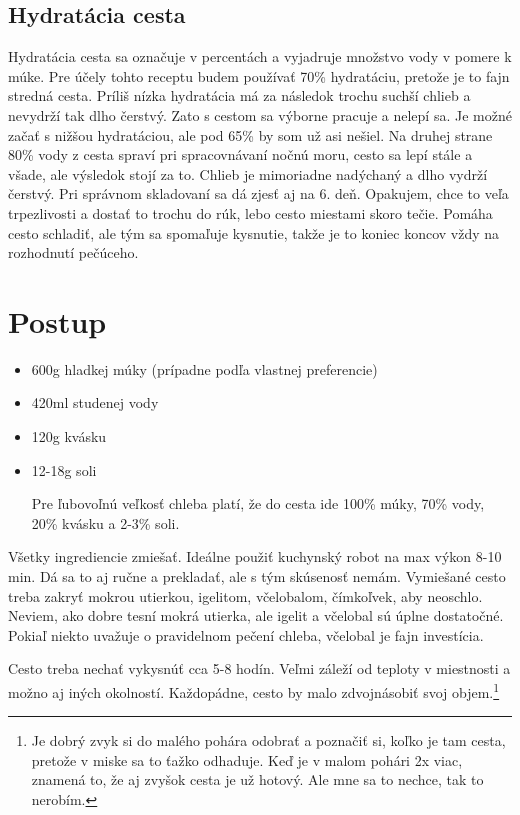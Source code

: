 \documentclass[a4paper,12pt]{article}
\begin{document}
\subsection{Hydratácia cesta}
Hydratácia cesta sa označuje v percentách a vyjadruje množstvo vody v pomere k múke. Pre účely tohto receptu budem používať 70\% hydratáciu, pretože je to fajn stredná cesta. Príliš nízka hydratácia má za následok trochu suchší chlieb a nevydrží tak dlho čerstvý. Zato s cestom sa výborne pracuje a nelepí sa. Je možné začať s nižšou hydratáciou, ale pod 65\% by som už asi nešiel. Na druhej strane 80\% vody z cesta spraví pri spracovnávaní nočnú moru, cesto sa lepí stále a všade, ale výsledok stojí za to. Chlieb je mimoriadne nadýchaný a dlho vydrží čerstvý. Pri správnom skladovaní sa dá zjesť aj na 6. deň. Opakujem, chce to veľa trpezlivosti a dostať to trochu do rúk, lebo cesto miestami skoro tečie. Pomáha cesto schladiť, ale tým sa spomaľuje kysnutie, takže je to koniec koncov vždy na rozhodnutí pečúceho.

\section{Postup}
\begin{tcolorbox}[colframe=blue!50!black, colback=blue!5!white, title=Ingrediencie]
    \begin{itemize}
        \item 600g hladkej múky (prípadne podľa vlastnej preferencie)
        \item 420ml studenej vody
        \item 120g kvásku
        \item 12-18g soli

        Pre ľubovoľnú veľkosť chleba platí, že do cesta ide 100\% múky, 70\% vody, 20\% kvásku a  2-3\% soli.
    \end{itemize}
\end{tcolorbox}

Všetky ingrediencie zmiešať. Ideálne použiť kuchynský robot na max výkon 8-10 min. Dá sa to aj ručne a prekladať, ale s tým skúsenosť nemám. Vymiešané cesto treba zakryť mokrou utierkou, igelitom, včelobalom, čímkoľvek, aby neoschlo. Neviem, ako dobre tesní mokrá utierka, ale igelit a včelobal sú úplne dostatočné. Pokiaľ niekto uvažuje o pravidelnom pečení chleba, včelobal je fajn investícia.

Cesto treba nechať vykysnúť cca 5-8 hodín. Veľmi záleží od teploty v miestnosti a možno aj iných okolností. Každopádne, cesto by malo zdvojnásobiť svoj objem.\footnote{Je dobrý zvyk si do malého pohára odobrať a poznačiť si, koľko je tam cesta, pretože v miske sa to ťažko odhaduje. Keď je v malom pohári 2x viac, znamená to, že aj zvyšok cesta je už hotový. Ale mne sa to nechce, tak to nerobím.}
\end{document}
